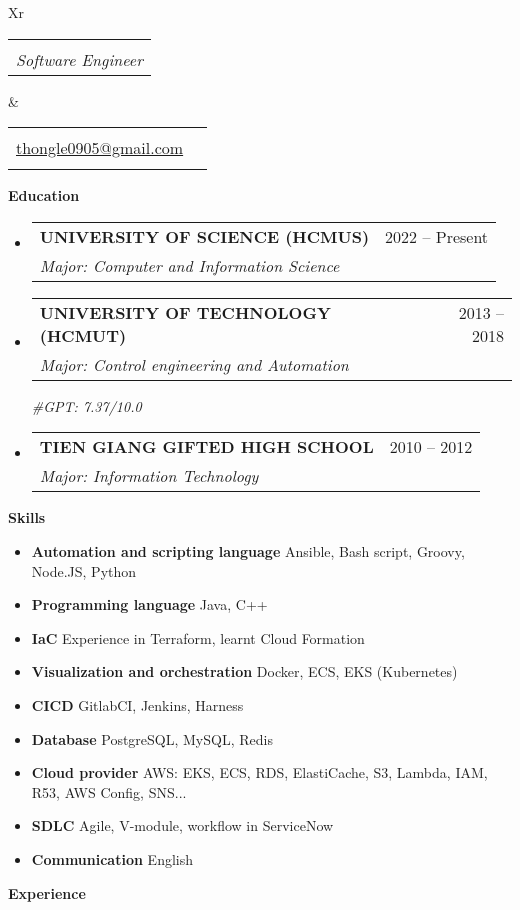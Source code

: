 \documentclass[letterpaper,12pt]{article}[leftmargin=*]
\makeatletter
\def \fullname {Thong Le Hoang}
\def \subtitle {Software Engineer}
\def \phoneicon {\faPhone}
\def \phonetext {+84-347-023-047}
\def \emailicon {\faEnvelope}
\def \emaillink {mailto:thongle0905@gmail.com}
\def \emailtext {thongle0905@gmail.com}
\def \addressicon {\faHome}
\def \addresstext {Ho Chi Minh, Viet Nam}
\def \headertype {\doublecol} %
\def \entryspacing {5pt}
\def \linkedin {\linkedinicon \hspace{3pt}\href{\linkedinlink}{\linkedintext}}
\def \phone {\phoneicon \hspace{3pt}{ \phonetext}}
\def \address {\addressicon \hspace{3pt}{ \addresstext}}
\def \email {\emailicon \hspace{3pt}\href{\emaillink}{\emailtext}}
\def \github {\githubicon \hspace{3pt}\href{\githublink}{\githubtext}}
\def \website {\websiteicon \hspace{3pt}\href{\websitelink}{\websitetext}}
\renewcommand{\section}[2]{\vspace{5pt}
  \colorbox{secondary}{\color{white}\raggedbottom\normalsize\textbf{{#1}{\hspace{7pt}#2}}}
}
\newcommand{\resumeEntryStart}{\begin{itemize}[leftmargin=2.5mm]}
\newcommand{\resumeEntryEnd}{\end{itemize}\vspace{\entryspacing}}
\newcommand{\resumeEntryTSDL}[4]{
  \vspace{-1pt}\item[]
    \begin{tabularx}{0.97\textwidth}{X@{\hspace{60pt}}r}
      \textbf{\color{primary}#1} & {\firabook\color{accent}\small#2} \\
      \textit{\color{accent}\small#3} & {\firabook\color{accent}\small#4} \\
    \end{tabularx}\vspace{-6pt}
}
\newcommand{\resumeEntryS}[2]{
  \item[]\small{
    \textbf{\color{primary}#1 }{ #2 \vspace{-6pt}}
  }
}
\newcommand{\doublecol}[6]{
  \begin{tabularx}{\textwidth}{Xr}
    {
      \begin{tabular}[c]{l}
        \fontsize{35}{45}\selectfont{\color{primary}{{\textbf{\fullname}}}} \\
        {\textit{\subtitle}} %
      \end{tabular}
    } & {
      \begin{tabular}[c]{l@{\hspace{1.5em}}l}
        {\small#4} & {\small#1} \\
        {\small#5} & {\small#2} \\
        {\small#6} & {\small#3}
      \end{tabular}
    }
  \end{tabularx}
}
\newcommand{\singlecol}[6]{
  \begin{tabularx}{\textwidth}{Xr}
    {
      \begin{tabular}[b]{l}
        \fontsize{35}{45}\selectfont{\color{primary}{{\textbf{\fullname}}}} \\
        {\textit{\subtitle}} %
      \end{tabular}
    } & {
      \begin{tabular}[c]{l}
        {\small#1} \\
        {\small#2} \\
        {\small#3} \\
        {\small#4} \\
        {\small#5} \\
        {\small#6}
      \end{tabular}
    }
  \end{tabularx}
}
\makeatother
\begin{document}


\headertype{\linkedin}{\github}{\website}{\phone}{\email}{\address} %
\vspace{10pt} %

\section{\faGraduationCap}{Education}
  \resumeEntryStart
    \resumeEntryTSDL
      {UNIVERSITY OF SCIENCE (HCMUS)}{2022 -- Present}
      {Major: Computer and Information Science}{}
    \resumeEntryTSDL
      {UNIVERSITY OF TECHNOLOGY (HCMUT)}{2013 -- 2018}
      {Major: Control engineering and Automation}{\vspace{5pt}}
      \textit{\color{accent}\small#GPT: 7.37/10.0}
    \resumeEntryTSDL
      {TIEN GIANG GIFTED HIGH SCHOOL}{2010 -- 2012}
      {Major: Information Technology}{}
  \resumeEntryEnd

\section{\faChartLine}{Skills}
 \resumeEntryStart
  \resumeEntryS{Automation and scripting language } {Ansible, Bash script, Groovy, Node.JS, Python}
  \resumeEntryS{Programming language } {Java, C++}
  \resumeEntryS{IaC } {Experience in Terraform, learnt Cloud Formation}
  \resumeEntryS{Visualization and orchestration } {Docker, ECS, EKS (Kubernetes)}
  \resumeEntryS{CICD } {GitlabCI, Jenkins, Harness}
  \resumeEntryS{Database } {PostgreSQL, MySQL, Redis}
  \resumeEntryS{Cloud provider } {AWS: EKS, ECS, RDS, ElastiCache, S3, Lambda, IAM, R53, AWS Config, SNS...}
  \resumeEntryS{SDLC } {Agile, V-module, workflow in ServiceNow}
  \resumeEntryS{Communication } {English}
 \resumeEntryEnd

\section{\faBriefcase}{Experience}
\end{document}
